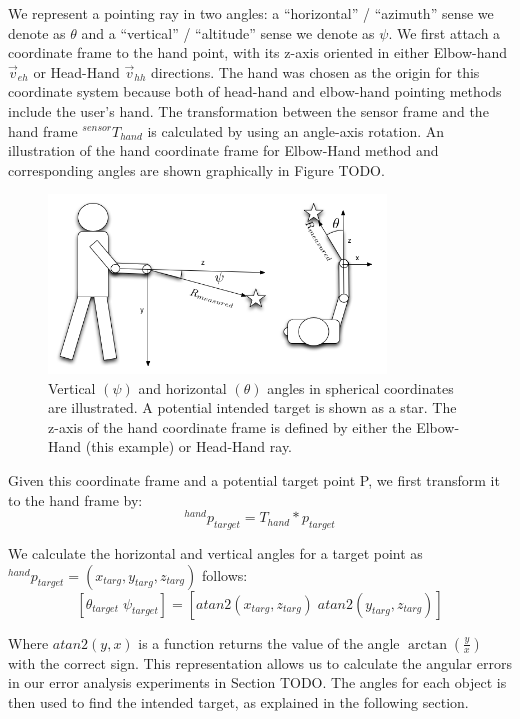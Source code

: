 \documentclass[12pt]{gatech-thesis}
\begin{document}
We represent a pointing ray in two angles: a ``horizontal'' / ``azimuth'' sense we denote as $\theta$ and a ``vertical'' / ``altitude'' sense we denote as $\psi$. We first attach a coordinate frame to the hand point, with its z-axis oriented in either Elbow-hand $\vec{v}_{eh}$ or Head-Hand $\vec{v}_{hh}$ directions. The hand was chosen as the origin for this coordinate system because both of head-hand and elbow-hand pointing methods include the user's hand. The transformation between the sensor frame and the hand frame $^{sensor}T_{hand}$ is calculated by using an angle-axis rotation. An illustration of the hand coordinate frame for Elbow-Hand method and corresponding angles are shown graphically in Figure TODO.

\begin{figure}[ht!]
\centering
\includegraphics[width=0.8\textwidth]{pics/person_angles_combined_2.png}
\caption{Vertical $(\psi)$ and horizontal $(\theta)$ angles in spherical coordinates are illustrated. A potential intended target is shown as a star. The z-axis of the hand coordinate frame is defined by either the Elbow-Hand (this example) or Head-Hand ray.}
\label{fig:pointing_angle_errors}
\end{figure}

Given this coordinate frame and a potential target point P, we first transform it to the hand frame by:
$$^{hand}p_{target} = T_{hand} * p_{target}$$

We calculate the horizontal and vertical angles for a target point as $^{hand}p_{target} = (x_{targ}, y_{targ}, z_{targ})$ follows:
$$[\theta_{target}\;\psi_{target}]=[atan2(x_{targ}, z_{targ})\;atan2(y_{targ}, z_{targ})]$$

Where $atan2(y,x)$ is a function returns the value of the angle $\arctan(\frac{y}{x})$ with the correct sign. This representation allows us to calculate the angular errors in our error analysis experiments in Section TODO. The angles for each object is then used to find the intended target, as explained in the following section.
\end{document}
